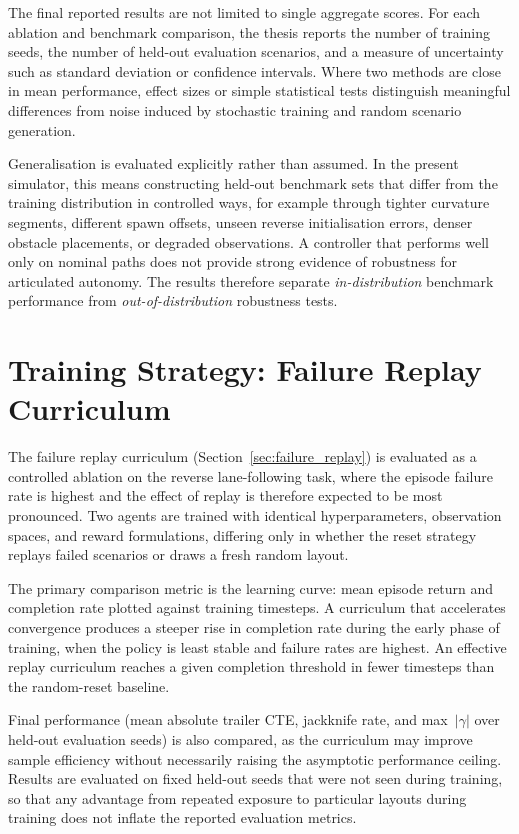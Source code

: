 The final reported results are not limited to single aggregate scores. For each ablation and benchmark comparison, the thesis reports the number of training seeds, the number of held-out evaluation scenarios, and a measure of uncertainty such as standard deviation or confidence intervals. Where two methods are close in mean performance, effect sizes or simple statistical tests distinguish meaningful differences from noise induced by stochastic training and random scenario generation.

Generalisation is evaluated explicitly rather than assumed. In the present simulator, this means constructing held-out benchmark sets that differ from the training distribution in controlled ways, for example through tighter curvature segments, different spawn offsets, unseen reverse initialisation errors, denser obstacle placements, or degraded observations. A controller that performs well only on nominal paths does not provide strong evidence of robustness for articulated autonomy. The results therefore separate \emph{in-distribution} benchmark performance from \emph{out-of-distribution} robustness tests.

\section{Training Strategy: Failure Replay Curriculum}

The failure replay curriculum (Section~\ref{sec:failure_replay}) is evaluated as a controlled ablation on the reverse lane-following task, where the episode failure rate is highest and the effect of replay is therefore expected to be most pronounced. Two agents are trained with identical hyperparameters, observation spaces, and reward formulations, differing only in whether the reset strategy replays failed scenarios or draws a fresh random layout.

The primary comparison metric is the learning curve: mean episode return and completion rate plotted against training timesteps. A curriculum that accelerates convergence produces a steeper rise in completion rate during the early phase of training, when the policy is least stable and failure rates are highest. An effective replay curriculum reaches a given completion threshold in fewer timesteps than the random-reset baseline.

Final performance (mean absolute trailer CTE, jackknife rate, and max~$|\gamma|$ over held-out evaluation seeds) is also compared, as the curriculum may improve sample efficiency without necessarily raising the asymptotic performance ceiling. Results are evaluated on fixed held-out seeds that were not seen during training, so that any advantage from repeated exposure to particular layouts during training does not inflate the reported evaluation metrics.


